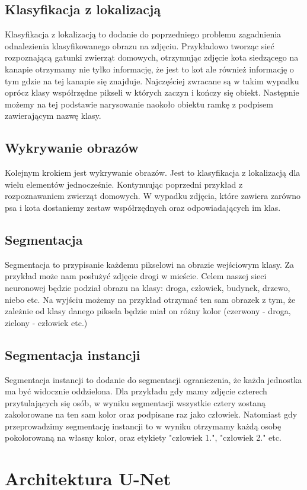\documentclass{article}
\begin{document}
\subsection{Klasyfikacja z lokalizacją}
Klasyfikacja z lokalizacją to dodanie do poprzedniego problemu zagadnienia odnalezienia klasyfikowanego obrazu na zdjęciu.
Przykładowo tworząc sieć rozpoznającą gatunki zwierząt domowych, otrzymując zdjęcie kota siedzącego na kanapie otrzymamy nie tylko informację,
że jest to kot ale również informację o tym gdzie na tej kanapie się znajduje.
Najczęściej zwracane są w takim wypadku oprócz klasy współrzędne pikseli w których zaczyn i kończy się obiekt.
Następnie możemy na tej podstawie narysowanie naokoło obiektu ramkę z podpisem zawierającym nazwę klasy.
\subsection{Wykrywanie obrazów}
Kolejnym krokiem jest wykrywanie obrazów. Jest to klasyfikacja z lokalizacją dla wielu elementów jednocześnie.
Kontynuując poprzedni przykład z rozpoznawaniem zwierząt domowych.
W wypadku zdjęcia, które zawiera zarówno psa i kota dostaniemy zestaw współrzędnych oraz odpowiadających im klas.
\subsection{Segmentacja}
Segmentacja to przypisanie każdemu pikselowi na obrazie wejściowym klasy.
Za przykład może nam posłużyć zdjęcie drogi w mieście.
Celem naszej sieci neuronowej będzie podział obrazu na klasy: droga, człowiek, budynek, drzewo, niebo etc.
Na wyjściu możemy na przykład otrzymać ten sam obrazek z tym, że zależnie od klasy danego piksela będzie miał on różny kolor (czerwony - droga, zielony - człowiek etc.)
\subsection{Segmentacja instancji}
Segmentacja instancji to dodanie do segmentacji ograniczenia, że każda jednostka ma być widocznie oddzielona.
Dla przykładu gdy mamy zdjęcie czterech przytulających się osób, w wyniku segmentacji wszystkie cztery zostaną zakolorowane na ten sam kolor oraz podpisane raz jako człowiek.
Natomiast gdy przeprowadzimy segmentację instancji to w wyniku otrzymamy każdą osobę pokolorowaną na własny kolor, oraz etykiety "człowiek 1.", "człowiek 2." etc.
\newpage
\section{Architektura U-Net}
\end{document}
